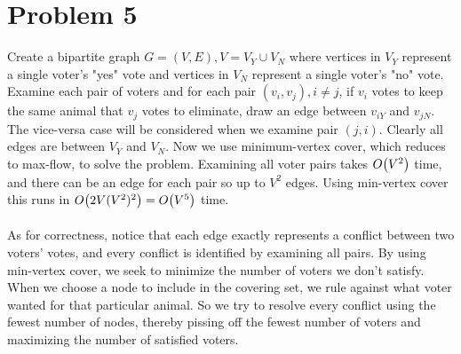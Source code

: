 \documentclass[11pt]{article}
\let\origleft\left
\let\origright\right
\renewcommand{\left}{\mathopen{}\mathclose\bgroup\origleft}
\renewcommand{\right}{\aftergroup\egroup\origright}
\newcommand{\p}[1]{\left(#1\right)}
\newcommand{\BigOh}[1]{O\p{#1}}
\begin{document}
\section*{Problem 5}
Create a bipartite graph $G=(V,E),V=V_Y\cup V_N$ where vertices in $V_Y$ represent a single voter's "yes" vote and vertices in $V_N$ represent a single voter's "no" vote. Examine each pair of voters and for each pair $(v_i,v_j),i\neq j$, if $v_i$ votes to keep the same animal that $v_j$ votes to eliminate, draw an edge between $v_{iY}$ and $v_{jN}$. The vice-versa case will be considered when we examine pair $(j,i)$. Clearly all edges are between $V_Y$ and $V_N$. Now we use minimum-vertex cover, which reduces to max-flow, to solve the problem. Examining all voter pairs takes $\BigOh{V^2}$ time, and there can be an edge for each pair so up to $V^2$ edges. Using min-vertex cover this runs in $\BigOh{2V(V^2)^2} = \BigOh{V^5}$ time. \\\\
As for correctness, notice that each edge exactly represents a conflict between two voters' votes, and every conflict is identified by examining all pairs. By using min-vertex cover, we seek to minimize the number of voters we don't satisfy. When we choose a node to include in the covering set, we rule against what voter wanted for that particular animal. So we try to resolve every conflict using the fewest number of nodes, thereby pissing off the fewest number of voters and maximizing the number of satisfied voters.
\end{document}
